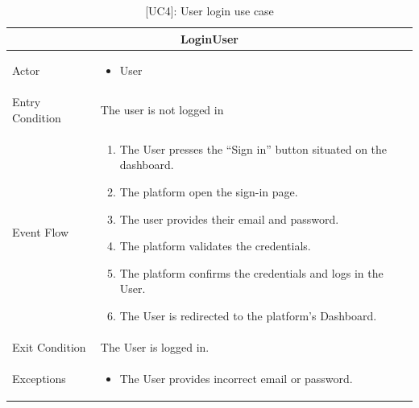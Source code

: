\begin{table}[H]
    \centering
    \begin{tabular}{|p{3cm}|p{12cm}|}
    \hline
    \multicolumn{2}{|c|}{\textbf{LoginUser}} \\ \hline
    Actor & 
    \begin{itemize}
        \item User
    \end{itemize}\\ \hline
    Entry Condition & The user is not logged in \\ \hline
    Event Flow &
    \begin{enumerate}         
        \item The User presses the “Sign in” button situated on the dashboard.
        \item The platform open the sign-in page.
        \item The user provides their email and password.
        \item The platform validates the credentials.
        \item The platform confirms the credentials and logs in the User.
        \item The User is redirected to the platform's Dashboard.
    \end{enumerate} \\ \hline
    Exit Condition & The User is logged in. \\ \hline
    Exceptions &
    \begin{itemize}
        \item The User provides incorrect email or password.
    \end{itemize} \\ \hline
    \end{tabular}
    \caption{[UC4]: User login use case}
    \label{tab:UC4}
\end{table}

